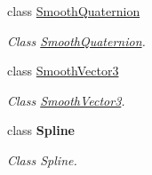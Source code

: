 \begin{DoxyCompactItemize}
class \hyperlink{class_radical_library_1_1_smooth_quaternion}{Smooth\+Quaternion}
\begin{DoxyCompactList}\small\item\em Class \hyperlink{class_radical_library_1_1_smooth_quaternion}{Smooth\+Quaternion}. \end{DoxyCompactList}\item 
class \hyperlink{class_radical_library_1_1_smooth_vector3}{Smooth\+Vector3}
\begin{DoxyCompactList}\small\item\em Class \hyperlink{class_radical_library_1_1_smooth_vector3}{Smooth\+Vector3}. \end{DoxyCompactList}\item 
class {\bfseries Spline}
\begin{DoxyCompactList}\small\item\em Class Spline. \end{DoxyCompactList}\end{DoxyCompactItemize}
